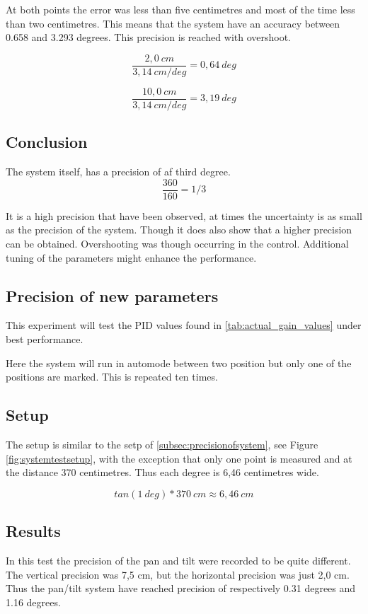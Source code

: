 At both points the error was less than five centimetres and most of the time
less than two centimetres. This means that the system have an accuracy between 0.658 and
3.293 degrees. This precision is reached with overshoot.

\[ \frac{2,0 \ cm}{3,14\ cm/deg} = 0,64 \ deg \]

\[ \frac{10,0 \ cm}{3,14 \ cm/deg} = 3,19 \ deg \]

\subsection*{Conclusion}

The system itself, has a precision of af third degree.
\[ \frac{360}{160} = 1/3 \]

It is a high precision that have been observed, at times the uncertainty is as
small as the precision of the system. Though it does also show that a higher
precision can be obtained. Overshooting was though occurring in the control.
Additional tuning of the parameters might enhance the performance.

\subsection{Precision of new parameters}\label{sec:precisionofsystem2}

This experiment will test the PID values found in \ref{tab:actual_gain_values}
under best performance.

Here the system will run in automode between two position but only one of the
positions are marked. This is repeated ten times.

\subsection*{Setup}

The setup is similar to the setp of \ref{subsec:precisionofsystem}, see
Figure \ref{fig:systemtestsetup}, with the exception that only one point is measured and at
the distance 370 centimetres. Thus each degree is 6,46 centimetres wide.

\[ tan(1 \ deg) * 370 \ cm \approx 6,46 \ cm \]

\subsection*{Results}

In this test the precision of the pan and tilt were recorded to be quite
different. The vertical precision was 7,5 cm, but the horizontal precision was just 2,0 cm. Thus the pan/tilt system have
reached precision of respectively 0.31 degrees and 1.16 degrees.


